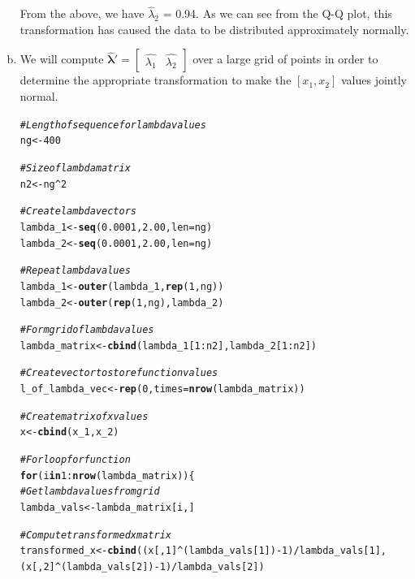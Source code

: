 \documentclass[12pt]{article}\usepackage[]{graphicx}\usepackage[]{color}
\makeatletter
\newcommand{\hlnum}[1]{\textcolor[rgb]{0.686,0.059,0.569}{#1}}%
\newcommand{\hlcom}[1]{\textcolor[rgb]{0.678,0.584,0.686}{\textit{#1}}}%
\newcommand{\hlopt}[1]{\textcolor[rgb]{0,0,0}{#1}}%
\newcommand{\hlstd}[1]{\textcolor[rgb]{0.345,0.345,0.345}{#1}}%
\newcommand{\hlkwa}[1]{\textcolor[rgb]{0.161,0.373,0.58}{\textbf{#1}}}%
\newcommand{\hlkwb}[1]{\textcolor[rgb]{0.69,0.353,0.396}{#1}}%
\newcommand{\hlkwc}[1]{\textcolor[rgb]{0.333,0.667,0.333}{#1}}%
\newcommand{\hlkwd}[1]{\textcolor[rgb]{0.737,0.353,0.396}{\textbf{#1}}}%
\newenvironment{kframe}{%
 \def\at@end@of@kframe{}%
 \ifinner\ifhmode%
  \def\at@end@of@kframe{\end{minipage}}%
  \begin{minipage}{\columnwidth}%
 \fi\fi%
 \def\FrameCommand##1{\hskip\@totalleftmargin \hskip-\fboxsep
 \colorbox{shadecolor}{##1}\hskip-\fboxsep
     \hskip-\linewidth \hskip-\@totalleftmargin \hskip\columnwidth}%
 \MakeFramed {\advance\hsize-\width
   \@totalleftmargin\z@ \linewidth\hsize
   \@setminipage}}%
 {\par\unskip\endMakeFramed%
 \at@end@of@kframe}
\newenvironment{knitrout}{}{} %
\newcommand{\vct}{\mathbf}
\makeatother
\begin{document}
\begin{enumerate}[a)]
\begin{knitrout}
\end{knitrout}

From the above, we have $\hat{\lambda}_2$ = 0.94. As we can see from the Q-Q plot, this transformation has caused the data to be distributed approximately normally. 

\item We will compute $\vct{\hat{\lambda}'} = \begin{bmatrix} \hat{\lambda_1} & \hat{\lambda_2} \end{bmatrix}$ over a large grid of points in order to determine the appropriate transformation to make the $[x_1, x_2]$ values jointly normal.

\begin{knitrout}
\color{fgcolor}\begin{kframe}
\begin{alltt}
\hlcom{#Length of sequence for lambda values}
\hlstd{ng} \hlkwb{<-} \hlnum{400}

\hlcom{#Size of lambda matrix}
\hlstd{n2} \hlkwb{<-} \hlstd{ng}\hlopt{^}\hlnum{2}

\hlcom{#Create lambda vectors}
\hlstd{lambda_1} \hlkwb{<-} \hlkwd{seq}\hlstd{(}\hlnum{0.0001}\hlstd{,} \hlnum{2.00}\hlstd{,} \hlkwc{len} \hlstd{= ng)}
\hlstd{lambda_2} \hlkwb{<-} \hlkwd{seq}\hlstd{(}\hlnum{0.0001}\hlstd{,} \hlnum{2.00}\hlstd{,} \hlkwc{len} \hlstd{= ng)}

\hlcom{#Repeat lambda values}
\hlstd{lambda_1} \hlkwb{<-} \hlkwd{outer}\hlstd{(lambda_1,} \hlkwd{rep}\hlstd{(}\hlnum{1}\hlstd{, ng))}
\hlstd{lambda_2} \hlkwb{<-} \hlkwd{outer}\hlstd{(}\hlkwd{rep}\hlstd{(}\hlnum{1}\hlstd{,ng), lambda_2)}

\hlcom{#Form grid of lambda values}
\hlstd{lambda_matrix} \hlkwb{<-} \hlkwd{cbind}\hlstd{(lambda_1[}\hlnum{1}\hlopt{:}\hlstd{n2], lambda_2[}\hlnum{1}\hlopt{:}\hlstd{n2])}

\hlcom{#Create vector to store function values}
\hlstd{l_of_lambda_vec} \hlkwb{<-} \hlkwd{rep}\hlstd{(}\hlnum{0}\hlstd{,} \hlkwc{times} \hlstd{=} \hlkwd{nrow}\hlstd{(lambda_matrix))}

\hlcom{#Create matrix of x values}
\hlstd{x} \hlkwb{<-} \hlkwd{cbind}\hlstd{(x_1, x_2)}

\hlcom{#For loop for function}
\hlkwa{for}\hlstd{(i} \hlkwa{in} \hlnum{1}\hlopt{:}\hlkwd{nrow}\hlstd{(lambda_matrix))\{}
  \hlcom{#Get lambda values from grid}
  \hlstd{lambda_vals} \hlkwb{<-} \hlstd{lambda_matrix[i, ]}

  \hlcom{#Compute transformed x matrix}
  \hlstd{transformed_x} \hlkwb{<-} \hlkwd{cbind}\hlstd{((x[,}\hlnum{1}\hlstd{]}\hlopt{^}\hlstd{(lambda_vals[}\hlnum{1}\hlstd{])} \hlopt{-} \hlnum{1}\hlstd{)}\hlopt{/}\hlstd{lambda_vals[}\hlnum{1}\hlstd{],}
                         \hlstd{(x[,}\hlnum{2}\hlstd{]}\hlopt{^}\hlstd{(lambda_vals[}\hlnum{2}\hlstd{])} \hlopt{-} \hlnum{1}\hlstd{)}\hlopt{/}\hlstd{lambda_vals[}\hlnum{2}\hlstd{])}


\end{alltt}
\end{kframe}
\end{knitrout}
\end{enumerate}
\end{document}
